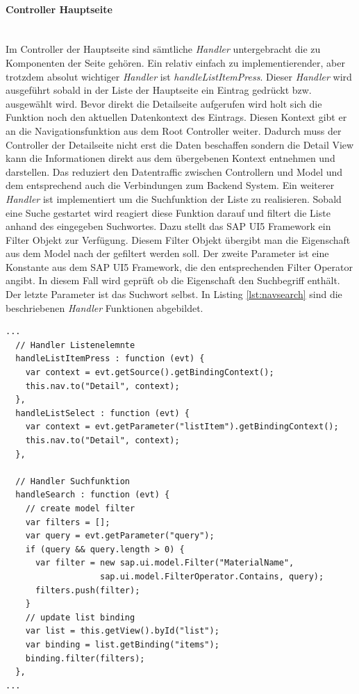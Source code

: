 \paragraph{Controller Hauptseite}$\;$ \\
Im Controller der Hauptseite sind sämtliche \textit{Handler} untergebracht die zu Komponenten der Seite gehören. Ein relativ einfach zu implementierender, aber trotzdem absolut wichtiger \textit{Handler} ist \textit{handleListItemPress}. Dieser \textit{Handler} wird ausgeführt sobald in der Liste der Hauptseite ein Eintrag gedrückt bzw. ausgewählt wird. Bevor direkt die Detailseite aufgerufen wird holt sich die Funktion noch den aktuellen Datenkontext des Eintrags. Diesen Kontext gibt er an die Navigationsfunktion aus dem Root Controller weiter. Dadurch muss der Controller der Detailseite nicht erst die Daten beschaffen sondern die Detail View kann die Informationen direkt aus dem übergebenen Kontext entnehmen und darstellen. Das reduziert den Datentraffic zwischen Controllern und Model und dem entsprechend auch die Verbindungen zum Backend System. Ein weiterer \textit{Handler} ist implementiert um die Suchfunktion der Liste zu realisieren. Sobald eine Suche gestartet wird reagiert diese Funktion darauf und filtert die Liste anhand des eingegeben Suchwortes. Dazu stellt das SAP UI5 Framework ein Filter Objekt zur Verfügung. Diesem Filter Objekt übergibt man die Eigenschaft aus dem Model nach der gefiltert werden soll. Der zweite Parameter ist eine Konstante aus dem SAP UI5 Framework, die den entsprechenden Filter Operator angibt. In diesem Fall wird geprüft ob die Eigenschaft den Suchbegriff enthält. Der letzte Parameter ist das Suchwort selbst. In Listing \ref{lst:navsearch} sind die beschriebenen \textit{Handler} Funktionen abgebildet.

\vspace{1em}
\begin{lstlisting}[frame=htrbl, caption=Navigation und Suchfunktion der Hauptseite, label=lst:navsearch]
...  
  // Handler Listenelemnte
  handleListItemPress : function (evt) {
    var context = evt.getSource().getBindingContext();
    this.nav.to("Detail", context);
  },
  handleListSelect : function (evt) {
    var context = evt.getParameter("listItem").getBindingContext();
    this.nav.to("Detail", context);
  },
  
  // Handler Suchfunktion
  handleSearch : function (evt) {		
    // create model filter
    var filters = [];
    var query = evt.getParameter("query");
    if (query && query.length > 0) {
      var filter = new sap.ui.model.Filter("MaterialName",
                   sap.ui.model.FilterOperator.Contains, query);
      filters.push(filter);
    }	
    // update list binding
    var list = this.getView().byId("list");
    var binding = list.getBinding("items");
    binding.filter(filters);
  },
...
\end{lstlisting}


